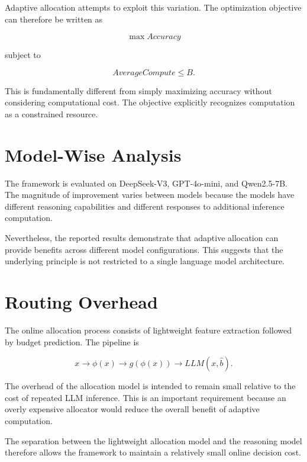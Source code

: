 \documentclass[12pt,a4paper,titlepage]{report}
\begin{document}
Adaptive allocation attempts to exploit this variation. The optimization objective can therefore be written as

\begin{equation}
\max Accuracy
\end{equation}

subject to

\begin{equation}
AverageCompute\leq B.
\end{equation}

This is fundamentally different from simply maximizing accuracy without considering computational cost. The objective explicitly recognizes computation as a constrained resource.

\section{Model-Wise Analysis}

The framework is evaluated on DeepSeek-V3, GPT-4o-mini, and Qwen2.5-7B. The magnitude of improvement varies between models because the models have different reasoning capabilities and different responses to additional inference computation.

Nevertheless, the reported results demonstrate that adaptive allocation can provide benefits across different model configurations. This suggests that the underlying principle is not restricted to a single language model architecture.

\section{Routing Overhead}

The online allocation process consists of lightweight feature extraction followed by budget prediction. The pipeline is

\begin{equation}
x
\rightarrow
\phi(x)
\rightarrow
g(\phi(x))
\rightarrow
LLM(x,\hat{b}).
\end{equation}

The overhead of the allocation model is intended to remain small relative to the cost of repeated LLM inference. This is an important requirement because an overly expensive allocator would reduce the overall benefit of adaptive computation.

The separation between the lightweight allocation model and the reasoning model therefore allows the framework to maintain a relatively small online decision cost.
\end{document}
